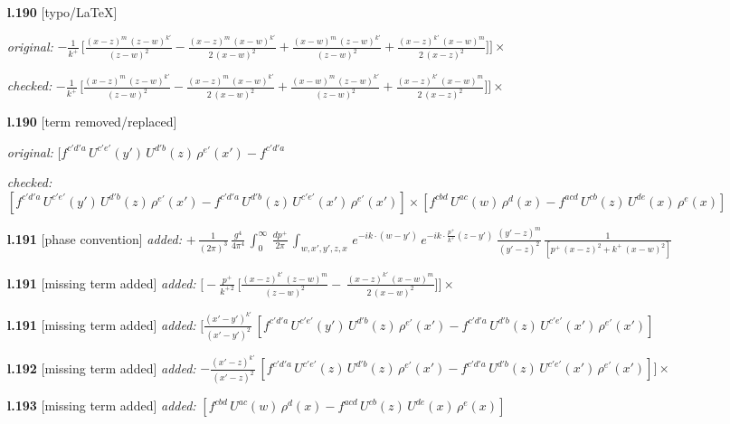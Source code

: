 \documentclass[10pt]{article}
\begin{document}
\begin{itemize}[leftmargin=2.2em,itemsep=1pt,topsep=2pt]
\item[\textbf{l.190}] \textsf{\small [typo/LaTeX]} \par\noindent\emph{original:} $\displaystyle -\frac{1}{k^{+}}\,\bigg[\frac{(x-z)^{m}\,(z-w)^{k'}}{(z-w)^{2}}-\frac{(x-z)^{m}\,(x-w)^{k'}}{2\,(x-w)^{2}}+\frac{(x-w)^{m}\,(z-w)^{k'}}{(z-w)^{2}} +\frac{(x-z)^{k'}\,(x-w)^{m}}{2\,(x-z)^{2}}\bigg]\Bigg]\times\,$\par\noindent\emph{checked:} $\displaystyle -\frac{1}{k^{+}}\,\bigg[\frac{(x-z)^{m}\,(z-w)^{k'}}{(z-w)^{2}}-\frac{(x-z)^{m}\,(x-w)^{k'}}{2\,(x-w)^{2}}+\frac{(x-w)^{m}\,(z-w)^{k'}}{(z-w)^{2}} +\frac{(x-z)^{k'}\,(x-w)^{m}}{2\,(x-z)^{2}}\bigg]\Bigg]\times\,$
\item[\textbf{l.190}] \textsf{\small [term removed/replaced]} \par\noindent\emph{original:} $\displaystyle [f^{c'd'a}\,U^{c'e'}(y')\,U^{d'b}(z)\,\rho^{e'}(x')-f^{c'd'a}\,$\par\noindent\emph{checked:} $\displaystyle [f^{c'd'a}\,U^{c'e'}(y')\,U^{d'b}(z)\,\rho^{e'}(x')-f^{c'd'a}\, U^{d'b}(z)\,U^{c'e'}(x')\,\rho^{e'}(x')]\times [f^{cbd}\,U^{ac}(w)\,\rho^{d}(x) -f^{acd}\,U^{cb}(z)\,U^{de}(x)\,\rho^{e}(x)]$
\item[\textbf{l.191}] \textsf{\small [phase convention]} \emph{added:} $\displaystyle +\,\frac{1}{(2\pi)^{3}}\,\frac{g^{4}}{4\pi^{4}}\,\int_{0}^{\infty}\, \frac{dp^{+}}{2\pi}\,\int_{w,x',y',z,x}\, e^{-ik\cdot (w-y')}\,e^{-ik\cdot \frac{p^{+}}{k^{+}}(z-y')}\, \frac{(y'-z)^{m}}{(y'-z)^{2}}\, \frac{1}{[p^{+}\,(x-z)^{2}+k^{+}\,(x-w)^{2}]}$
\item[\textbf{l.191}] \textsf{\small [missing term added]} \emph{added:} $\displaystyle \Bigg[ -\frac{p^{+}}{k^{+\,2}}\,\bigg[\frac{(x-z)^{k'}\,(z-w)^{m}}{(z-w)^{2}} -\,\frac{(x-z)^{k'}\,(x-w)^{m}}{2\,(x-w)^{2}}\bigg] \Bigg]\times\,$
\item[\textbf{l.191}] \textsf{\small [missing term added]} \emph{added:} $\displaystyle \Bigg[\frac{(x'-y')^{k'}}{(x'-y')^{2}}\,[f^{c'd'a}\,U^{c'e'}(y')\,U^{d'b}(z)\,\rho^{e'}(x')-f^{c'd'a}\, U^{d'b}(z)\,U^{c'e'}(x')\,\rho^{e'}(x')]$
\item[\textbf{l.192}] \textsf{\small [missing term added]} \emph{added:} $\displaystyle -\frac{(x'-z)^{k'}}{(x'-z)^{2}}\,[f^{c'd'a}\,U^{c'e'}(z)\,U^{d'b}(z)\,\rho^{e'}(x')-f^{c'd'a}\, U^{d'b}(z)\,U^{c'e'}(x')\,\rho^{e'}(x')]\Bigg]\times$
\item[\textbf{l.193}] \textsf{\small [missing term added]} \emph{added:} $\displaystyle [f^{cbd}\,U^{ac}(w)\,\rho^{d}(x) -f^{acd}\,U^{cb}(z)\,U^{de}(x)\,\rho^{e}(x)]$

\end{itemize}
\end{document}
